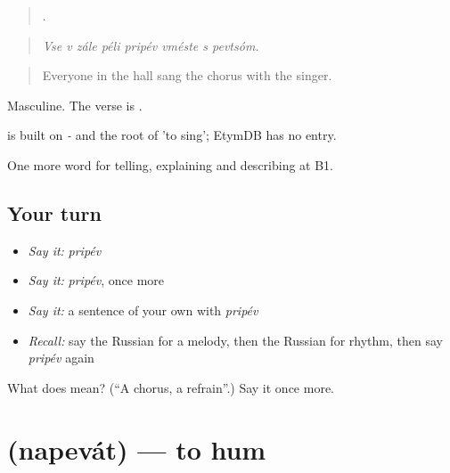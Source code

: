 \begin{quote}
       .
\end{quote}

\begin{quote}
\emph{Vse v zále péli pripév vméste s pevtsóm.}
\end{quote}

\begin{quote}
Everyone in the hall sang the chorus with the singer.
\end{quote}

Masculine. The verse is \emph{}.

\begin{cousinweb}
\emph{} is built on \emph{-} and the root of \emph{} 'to sing'; EtymDB has no entry.
\end{cousinweb}

\begin{grammarlens}[title={What you've built}]
One more word for telling, explaining and describing at B1.
\end{grammarlens}

\subsection*{Your turn}
\begin{itemize}
\raggedright
  \item \emph{Say it:} \emph{pripév}
  \item \emph{Say it:} \emph{pripév}, once more
  \item \emph{Say it:} a sentence of your own with \emph{pripév}
  \item \emph{Recall:} say the Russian for a melody, then the Russian for rhythm, then say \emph{pripév} again
\end{itemize}

\begin{tcolorbox}[breakable,colback=teal!4,colframe=teal!35!black,title={Before you move on}]
What does  mean? (\textquotedblleft{}A chorus, a refrain\textquotedblright{}.) Say it once more.
\end{tcolorbox}
\section[\texorpdfstring{\ru{напевать} (napevát)}{напевать (napevát)}]{ (napevát) — to hum}

\label{lesson:RU-C516-napevat}




